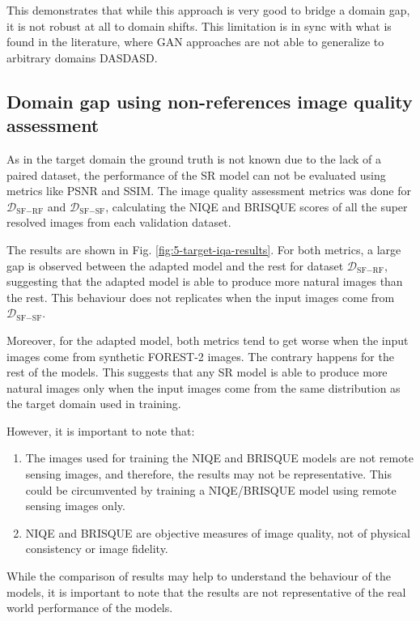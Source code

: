         
    This demonstrates that while this approach is very good to bridge a domain gap, it is not robust at all to domain shifts. 
    This limitation is in sync with what is found in the literature, where GAN approaches are not able to generalize to arbitrary domains DASDASD.

    \subsection{Domain gap using non-references image quality assessment}

    As in the target domain the ground truth is not known due to the lack of a paired dataset, the performance of the SR model can not be evaluated using metrics like PSNR and SSIM.
    The image quality assessment metrics was done for $\mathcal{D}_{\text{SF}-\text{RF}}$ and $\mathcal{D}_{\text{SF}-\text{SF}}$, calculating the NIQE and BRISQUE scores of all the super resolved images from each validation dataset.
    
    The results are shown in Fig. \ref{fig:5-target-iqa-results}.
    For both metrics, a large gap is observed between the adapted model and the rest for dataset $\mathcal{D}_{\text{SF}-\text{RF}}$, suggesting that the adapted model is able to produce more natural images than the rest.
    This behaviour does not replicates when the input images come from $\mathcal{D}_{\text{SF}-\text{SF}}$.
    
    Moreover, for the adapted model, both metrics tend to get worse when the input images come from synthetic FOREST-2 images. The contrary happens for the rest of the models.
    This suggests that any SR model is able to produce more natural images only when the input images come from the same distribution as the target domain used in training.
    
    However, it is important to note that: 

    \begin{enumerate}
        \item The images used for training the NIQE and BRISQUE models are not remote sensing images, and therefore, the results may not be representative. This could be circumvented by training a NIQE/BRISQUE model using remote sensing images only.
        \item NIQE and BRISQUE are objective measures of image quality, not of physical consistency or image fidelity.
    \end{enumerate}

    While the comparison of results may help to understand the behaviour of the models, it is important to note that the results are not representative of the real world performance of the models. 

